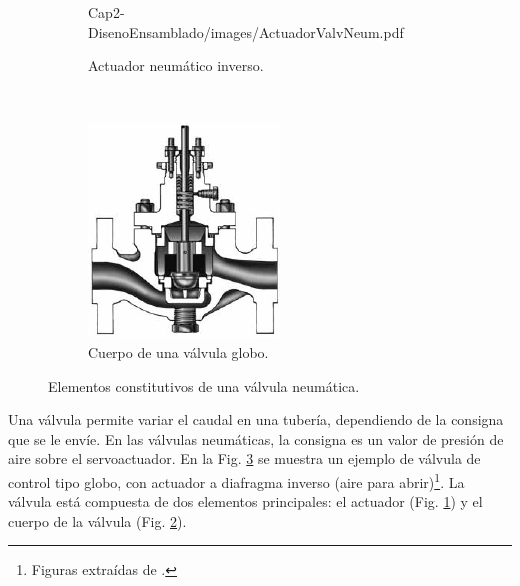 \begin{figure}[t]
\begin{subfigure}[b]{0.37\textwidth}
	{Cap2-DisenoEnsamblado/images/ActuadorValvNeum.pdf}
                \caption{Actuador neumático inverso.}
                \label{fig:actuadorValv}
        \end{subfigure}%
        ~
        \begin{subfigure}[b]{0.37\textwidth}
\includegraphics[width=\textwidth]{Cap2-DisenoEnsamblado/images/ValvGlob.pdf}
                \caption{Cuerpo de una válvula globo.}
                \label{fig:cuerpoValv}
        \end{subfigure}
        \caption{Elementos constitutivos de una válvula neumática.}
        \label{fig:elementosValv}
\end{figure}

Una válvula permite variar el caudal en una tubería, dependiendo de la consigna
que se le envíe.
En las válvulas neumáticas, la consigna es un valor de presión de aire sobre el
servoactuador.
En la Fig. \ref{fig:elementosValv} se muestra un ejemplo de válvula de control
tipo globo, con actuador a diafragma inverso (aire para
abrir)\footnote{Figuras extraídas de \cite{bib:controlValveHandbook}.}.
La válvula está compuesta de dos elementos principales: el actuador
(Fig. \ref{fig:actuadorValv}) y el cuerpo de la válvula (Fig.
\ref{fig:cuerpoValv}).

